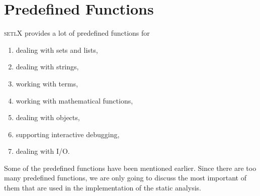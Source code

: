 \documentclass[11pt]{report}
\begin{document}
\section{Predefined Functions}

\textsc{setlX} provides a lot of predefined functions for
\begin{enumerate}
\item dealing with sets and lists,
\item dealing with strings,
\item working with terms,
\item working with mathematical functions,
\item dealing with objects,
\item supporting interactive debugging,
\item dealing with I/O.
\end{enumerate}

Some of the predefined functions have been mentioned earlier. Since there are too many predefined functions, we are only going to discuss the most important of them that are used in the implementation of the static analysis.
\end{document}
